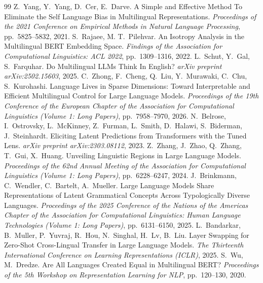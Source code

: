 \documentclass[11pt,a4paper]{article}
\begin{document}
\begin{thebibliography}{99}
Z.~Yang, Y.~Yang, D.~Cer, E.~Darve. A Simple and Effective Method To Eliminate the Self Language Bias in Multilingual Representations. \emph{Proceedings of the 2021 Conference on Empirical Methods in Natural Language Processing}, pp.~5825--5832, 2021.
S.~Rajaee, M. T.~Pilehvar. An Isotropy Analysis in the Multilingual BERT Embedding Space. \emph{Findings of the Association for Computational Linguistics: ACL 2022}, pp.~1309--1316, 2022.
L.~Schut, Y.~Gal, S.~Farquhar. Do Multilingual LLMs Think In English? \emph{arXiv preprint arXiv:2502.15603}, 2025.
C.~Zhong, F.~Cheng, Q.~Liu, Y.~Murawaki, C.~Chu, S.~Kurohashi. Language Lives in Sparse Dimensions: Toward Interpretable and Efficient Multilingual Control for Large Language Models. \emph{Proceedings of the 19th Conference of the European Chapter of the Association for Computational Linguistics (Volume 1: Long Papers)}, pp.~7958--7970, 2026.
N.~Belrose, I.~Ostrovsky, L.~McKinney, Z.~Furman, L.~Smith, D.~Halawi, S.~Biderman, J.~Steinhardt. Eliciting Latent Predictions from Transformers with the Tuned Lens. \emph{arXiv preprint arXiv:2303.08112}, 2023.
Z.~Zhang, J.~Zhao, Q.~Zhang, T.~Gui, X.~Huang. Unveiling Linguistic Regions in Large Language Models. \emph{Proceedings of the 62nd Annual Meeting of the Association for Computational Linguistics (Volume 1: Long Papers)}, pp.~6228--6247, 2024.
J.~Brinkmann, C.~Wendler, C.~Bartelt, A.~Mueller. Large Language Models Share Representations of Latent Grammatical Concepts Across Typologically Diverse Languages. \emph{Proceedings of the 2025 Conference of the Nations of the Americas Chapter of the Association for Computational Linguistics: Human Language Technologies (Volume 1: Long Papers)}, pp.~6131--6150, 2025.
L.~Bandarkar, B.~Muller, P.~Yuvraj, R.~Hou, N.~Singhal, H.~Lv, B.~Liu. Layer Swapping for Zero-Shot Cross-Lingual Transfer in Large Language Models. \emph{The Thirteenth International Conference on Learning Representations (ICLR)}, 2025.
S.~Wu, M.~Dredze. Are All Languages Created Equal in Multilingual BERT? \emph{Proceedings of the 5th Workshop on Representation Learning for NLP}, pp.~120--130, 2020.

\end{thebibliography}
\end{document}
